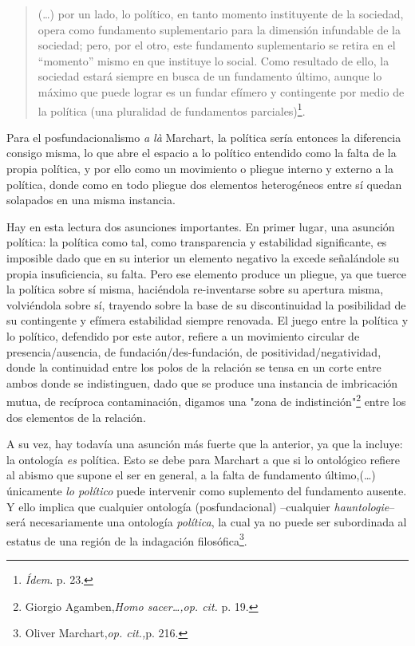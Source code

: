 \begin{quote}
(\dots) por un lado, lo político, en tanto momento instituyente de
la sociedad, opera como fundamento suplementario para la dimensión
infundable de la sociedad; pero, por el otro, este fundamento
suplementario se retira en el ``momento'' mismo en que instituye lo
social. Como resultado de ello, la sociedad estará siempre en busca de
un fundamento último, aunque lo máximo que puede lograr es un fundar
efímero y contingente por medio de la política (una pluralidad de
fundamentos parciales)\footnote{\emph{Ídem}. p. 23.}.
\end{quote}

Para el posfundacionalismo \emph{a là} Marchart, la política sería
entonces la diferencia consigo misma, lo que abre el espacio a lo
político entendido como la falta de la propia política, y por ello como
un movimiento o pliegue interno y externo a la política, donde como en
todo pliegue dos elementos heterogéneos entre sí quedan solapados en una
misma instancia.

Hay en esta lectura dos asunciones importantes. En primer lugar, una
asunción política: la política como tal, como transparencia y
estabilidad significante, es imposible dado que en su interior un
elemento negativo la excede señalándole su propia insuficiencia, su
falta. Pero ese elemento produce un pliegue, ya que tuerce la política
sobre sí misma, haciéndola re-inventarse sobre su apertura misma,
volviéndola sobre sí, trayendo sobre la base de su discontinuidad la
posibilidad de su contingente y efímera estabilidad siempre renovada. El
juego entre la política y lo político, defendido por este autor, refiere
a un movimiento circular de presencia/ausencia, de
fundación/des-fundación, de positividad/negatividad, donde la
continuidad entre los polos de la relación se tensa en un corte entre
ambos donde se indistinguen, dado que se produce una instancia de
imbricación mutua, de recíproca contaminación, digamos una "zona de
indistinción"\footnote{Giorgio Agamben,\emph{Homo sacer\ldots,op. cit.}
  p. 19.} entre los dos elementos de la relación.

A su vez, hay todavía una asunción más fuerte que la anterior, ya que la
incluye: la ontología \emph{es} política. Esto se debe para Marchart a
que si lo ontológico refiere al abismo que supone el ser en general, a
la falta de fundamento último,(\dots) únicamente \emph{lo político}
puede intervenir como suplemento del fundamento ausente. Y ello implica
que cualquier ontología (posfundacional) --cualquier
\emph{hauntologie}-- será necesariamente una ontología \emph{política},
la cual ya no puede ser subordinada al estatus de una región de la
indagación filosófica\footnote{Oliver Marchart,\emph{op. cit.,}p. 216.}.

